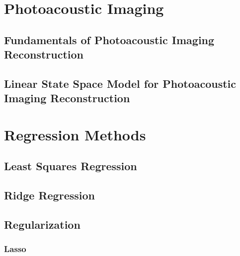 \section{Photoacoustic Imaging} \label{sec:lit}

\subsection{Fundamentals of Photoacoustic Imaging Reconstruction}

\subsection{Linear State Space Model for Photoacoustic Imaging Reconstruction}

\section{Regression Methods} \label{sec:lit:first}

\subsection{Least Squares Regression} \label{sec:lit:first:one}

\subsection{Ridge Regression} \label{sec:lit:first:two}

\subsection{Regularization} \label{sec:lit:first:three}

\subsubsection{Lasso} \label{sec:lit:first:three:one}

